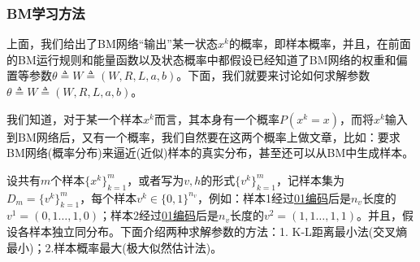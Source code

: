         \subsubsection{BM学习方法}
            \par
            上面，我们给出了BM网络“输出”某一状态$x^k$的概率，即样本概率，并且，在前面的BM运行规则和能量函数以及状态概率中都假设已经知道了BM网络的权重和偏置等参数$\theta \triangleq W \triangleq (W,R,L,a,b)$。下面，我们就要来讨论如何求解参数$\theta \triangleq W \triangleq (W,R,L,a,b)$。
            \par
            我们知道，对于某一个样本$x^k$而言，其本身有一个概率$P(x^k = x)$，而将$x^k$输入到BM网络后，又有一个概率，我们自然要在这两个概率上做文章，比如：要求BM网络(概率分布)来逼近(近似)样本的真实分布，甚至还可以从BM中生成样本。
            \par
            设共有$m$个样本$\{x^k\}_{k=1}^m$，或者写为$v,h$的形式$\{v^k\}_{k=1}^m$，记样本集为$D_m = \{v^k\}_{k=1}^m$，每个样本$v^k\in \{0,1\}^{n_v}$，例如：样本1经过\underline{01编码}后是$n_v$长度的$v^1 = (0,1\dots,1,0)$；样本2经过\underline{01编码}后是$n_v$长度的$v^2 = (1,1\dots,1,1)$。并且，假设各样本独立同分布。下面介绍两种求解参数的方法：1. K-L距离最小法(交叉熵最小)；2.样本概率最大(极大似然估计法)。

